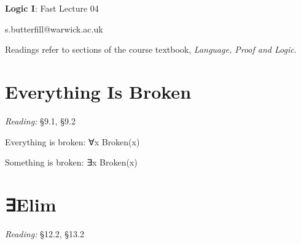 \documentclass[12pt]{extarticle}
\date{}
\makeatletter
\def \ititle {Origins of Mind}
\def \isubtitle {Lecture 08}
\def \iemail{s.butterfill@warwick.ac.uk}
\makeatother
\begin{document}
\raggedcolumns

\begin{multicols*}{3}

\setlength\footnotesep{1em}








\def \ititle {Logic I}
 
\def \isubtitle {Fast Lecture 04}
 
\begin{center}
 
{\Large
 
\textbf{\ititle}: \isubtitle
 
}
 
 
 
\iemail %
 
\end{center}
 
Readings refer to sections of the course textbook, \emph{Language, Proof and Logic}.
 
 
 
\section{Everything Is Broken}
 
\emph{Reading:} §9.1, §9.2
 
Everything is broken: ∀x Broken(x)
 
Something is broken: ∃x Broken(x)
 
 
 
\section{∃Elim}
 
\emph{Reading:} §12.2, §13.2
 

\end{multicols*}
\end{document}
